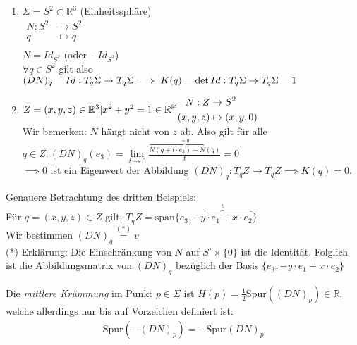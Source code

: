 \documentclass[../main.tex]{subfiles}
\begin{document}
\begin{examples}
\begin{enumerate}
        \item $\Sigma = S^{2} \subset \mathbb{R}^{3}$ (Einheitssphäre)\\
        $\begin{aligned}
            N: S^{2} &\to S^{2}\\
            q &\mapsto q\\
        \end{aligned}$\\
        $N = Id_{S^{2}}$ (oder $-Id_{S^{2}}$)\\
        $\forall q \in S^{2}$ gilt also $(DN)_{q} = Id : T_{q}\Sigma \to T_{q}\Sigma\\
        \implies K(q) = \det{Id: T_{q}\Sigma \to T_{q}\Sigma} = 1$
        \item $Z = {(x,y,z)\in \mathbb{R}^{3} | x^{2} + y^{2} = 1}\in \mathbb{R^{3}}\\
        \begin{aligned}
            N : Z &\to S^{2}\\
            (x,y,z) &\mapsto (x,y,0)\\
        \end{aligned}$\\
        Wir bemerken: $N$ hängt nicht von $z$ ab. 
        Also gilt für alle $q \in Z : (DN)_{q}(e_{3}) = \lim\limits_{t \rightarrow 0}{\frac{\overbrace{N(q + t \cdot e_{3}) - N(q)}^{=0}}{t}} = 0$\\
        $\implies 0$ ist ein Eigenwert der Abbildung $(DN)_{q} : T_{q}Z \to T_{q}Z \implies K(q) = 0$.
    \end{enumerate}
    \begin{zusatz}
        Genauere Betrachtung des dritten Beispiels:\\
        Für $q = (x,y,z) \in Z$ gilt: $T_{q}Z = \text{span}\{e_{3}, \overbrace{-y \cdot e_{1} + x \cdot e_{2}}^{v}\}$\\
        Wir bestimmen $(DN)_{q}\stackrel{(\text{*})}{=} v$\\
        (*) Erklärung: Die Einschränkung von $N$ auf $S'\times \{0\}$ ist die Identität. Folglich ist die Abbildungsmatrix von $(DN)_{q}$ bezüglich der Basis $\{ e_{3}, -y \cdot e_{1} + x \cdot e_{2} \}$
    \end{zusatz}
\end{examples}
\begin{definition}
    Die \emph{mittlere Krümmung} im Punkt $p \in \Sigma$ ist $H(p) = \frac{1}{2} \text{Spur}((DN)_{p})\in \mathbb{R}$, welche allerdings nur bis auf Vorzeichen definiert ist:
    \begin{align*}
        \text{Spur}(-(DN)_{p}) = - \text{Spur}(DN)_{p}
    \end{align*}

\end{definition}
\end{document}
